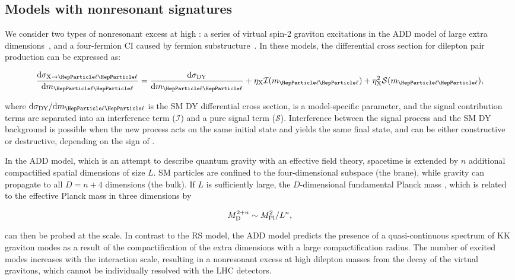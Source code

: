 \documentclass[11pt,twoside,a4paper,cmspaper,final,collab]{cms-tdr}
\begin{document}
\subsection{Models with nonresonant signatures}
We consider two types of nonresonant excess at high \mll: a series of virtual spin-2 graviton excitations in the ADD model of large extra dimensions~\cite{arkani98:hlz}, and a four-fermion CI caused by fermion substructure~\cite{Eichten:1984eu}. In these models, the differential  cross section for dilepton pair production can be expressed as:
\begin{linenomath}
\begin{equation}
  \dd{\sigma_{\text{X}\to\Pell\Pell}}{\mll}=
  \dd{\sigma_{\text{DY}}}{\mll}
  +\etaCIADD{X}\mathcal{I}(\mll)
  +\etaCIADD{X}^{2}\mathcal{S}(\mll)\text{,}
  \label{eq:dilepxs}
\end{equation}
\end{linenomath}
where $\text{d}\sigma_{\text{DY}}/\text{d}\mll$ is the SM DY differential cross section,  is a model-specific parameter, and the signal contribution terms are separated into an interference term ($\mathcal{I}$) and a pure signal term ($\mathcal{S}$).
Interference between the signal process and the SM DY background is possible when the new process acts on the same initial state and yields the same final state, and can be either constructive or destructive, depending on the sign of . 

In the ADD model, which is an attempt to describe quantum gravity with an effective field theory, spacetime is extended by $n$ additional compactified spatial dimensions of size $L$. SM particles are confined to the four-dimensional subspace (the brane), while gravity can propagate to all $D=n+4$ dimensions (the bulk).
If $L$ is sufficiently large, the $D$-dimensional fundamental Planck mass , which is related to the effective Planck mass  in three dimensions by
\begin{linenomath}
\begin{equation}
  M_{\mathrm{D}}^{2+n} \sim M_{\mathrm{Pl}}^2/L^n\text{,}
  \label{eq:led-planck}
\end{equation}
\end{linenomath}
can then be probed at the \TeVns scale.
In contrast to the RS model, the ADD model predicts the presence of a quasi-continuous spectrum of KK graviton modes as a result of the compactification of the extra dimensions with a large compactification radius. The number of excited modes increases with the interaction scale, resulting in a nonresonant excess at high dilepton masses from the decay of the virtual gravitons, which cannot be individually resolved with the LHC detectors. 
\end{document}

